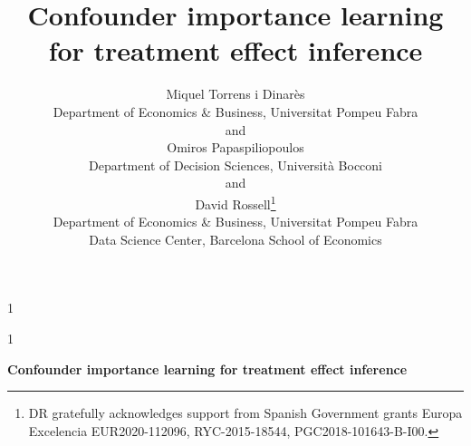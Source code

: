 \documentclass[12pt]{article}
\newcommand{\blind}{1}
\begin{document}
%

\def\spacingset#1{\renewcommand{\baselinestretch}%
{#1}\small\normalsize} \spacingset{1}



\blind
{
  \title{ Confounder importance learning for treatment effect inference }
  \author{
Miquel Torrens i Dinar\`{e}s\\
    Department of Economics \& Business, Universitat Pompeu Fabra\\
    and \\
    Omiros Papaspiliopoulos \\
    Department of Decision Sciences, Universit\`{a} Bocconi\\
    and \\
    David Rossell\thanks{
    DR gratefully acknowledges support from Spanish Government grants Europa Excelencia EUR2020-112096, RYC-2015-18544, PGC2018-101643-B-I00.}\hspace{.2cm}\\
    Department of Economics \& Business, Universitat Pompeu Fabra \\ Data Science Center, Barcelona School of Economics
}
  \maketitle
} \fi

\blind
{
  \bigskip
  \bigskip
  \bigskip
  \begin{center}
    {\LARGE\bf  Confounder importance learning for treatment effect inference }
\end{center}
  \medskip
} \fi
\end{document}

